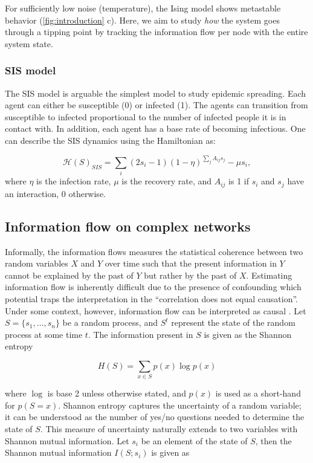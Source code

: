 \documentclass[a4paper, 11pt, twocolumn]{article}
\begin{document}
For sufficiently  low noise  (temperature), the  Ising model
shows metastable behavior (\cref{fig:introduction} c). Here,
we  aim to  study \emph{how}  the system  goes through  a tipping
point by  tracking the  information flow  per node  with the
entire system state.

\subsubsection{SIS model}
\label{sec:orgddc3122}
The  SIS  model is  arguable  the  simplest model  to  study
epidemic spreading. Each agent can either be susceptible (0)
or infected (1). The  agents can transition from susceptible
to infected proportional to the number of infected people it
is in contact with. In addition,  each agent has a base rate
of becoming  infectious. One  can describe the  SIS dynamics
using the Hamiltonian as:

\begin{equation}
\label{eq:sis}
\mathcal{H}(S)_{SIS} = \sum_i (2s_i - 1) (1 - \eta)^{\sum_{j} A_{ij} s_j} - \mu s_i,
\end{equation}
where $\eta$ is  the infection rate, $\mu$ is  the recovery rate,
and $A_{ij}$ is 1 if $s_i$ and $s_j$ have an interaction, 0
otherwise.

\subsection{Information flow on complex networks}
\label{sec:org3d3e541}
Informally, the  information flows measures  the statistical
coherence between two random variables $X$ and $Y$ over time
such that the present information in $Y$ cannot be explained
by the past of $Y$ but rather by the past of $X$. Estimating
information flow is inherently difficult due to the presence
of confounding  which potential traps the  interpretation in
the  ``correlation  does  not equal  causation''.  Under  some
context,  however, information  flow can  be interpreted  as
causal \cite{vanElteren2021}. Let $S=\{s_1, \dots, s_n\}$ be a
random process, and $S^t$ represent  the state of the random
process at some time $t$.  The information present in $S$ is
given as the Shannon entropy

\begin{equation}
H(S) = \sum_{x \in S} p(x) \log p(x)
\end{equation}

where $\log$ is  base 2 unless otherwise  stated, and $p(x)$
is  used as  a short-hand  for $p(S  = x)$.  Shannon entropy
captures the  uncertainty of  a random  variable; it  can be
understood  as  the number  of  yes/no  questions needed  to
determine  the state  of  $S$. This  measure of  uncertainty
naturally  extends  to  two variables  with  Shannon  mutual
information. Let  $s_i$ be an  element of the state  of $S$,
then the Shannon mutual information $I(S; s_i)$ is given as
\end{document}
